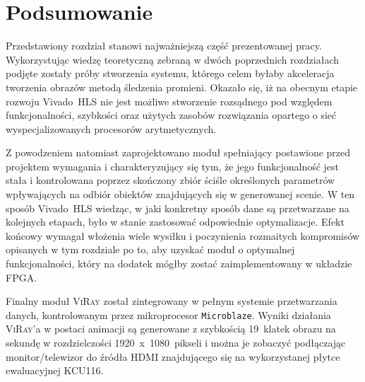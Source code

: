 
\section*{Podsumowanie}
Przedstawiony rozdział stanowi najważniejszą część prezentowanej pracy. Wykorzystując wiedzę teoretyczną zebraną w dwóch poprzednich rozdziałach podjęte zostały próby stworzenia systemu, którego celem byłaby akceleracja tworzenia obrazów metodą śledzenia promieni. Okazało się, iż na obecnym etapie rozwoju Vivado~HLS nie jest możliwe stworzenie rozsądnego pod względem funkcjonalności, szybkości oraz użytych zasobów rozwiązania opartego o sieć wyspecjalizowanych procesorów arytmetycznych. 

Z powodzeniem natomiast zaprojektowano moduł spełniający postawione przed projektem wymagania i charakteryzujący się tym, że jego funkcjonalność jest stała i kontrolowana poprzez skończony zbiór ściśle określonych parametrów wpływających na odbiór obiektów znajdujących się w generowanej scenie. W ten sposób Vivado~HLS wiedząc, w jaki konkretny sposób dane są przetwarzane na kolejnych etapach, było w stanie zastosować odpowiednie optymalizacje. Efekt końcowy wymagał włożenia wiele wysiłku i poczynienia rozmaitych kompromisów opisanych w tym rozdziale po to, aby uzyskać moduł o optymalnej funkcjonalności, który na dodatek mógłby zostać zaimplementowany w układzie FPGA.

Finalny moduł \textsc{ViRay} został zintegrowany w pełnym systemie przetwarzania danych, kontrolowanym przez mikroprocesor \texttt{Microblaze}. Wyniki działania \textsc{ViRay}'a w postaci animacji są generowane z szybkością 19~klatek obrazu na sekundę w rozdzielczości 1920~x~1080~pikseli i można je zobaczyć podłączając monitor/telewizor do źródła HDMI znajdującego się na wykorzystanej płytce ewaluacyjnej KCU116.


